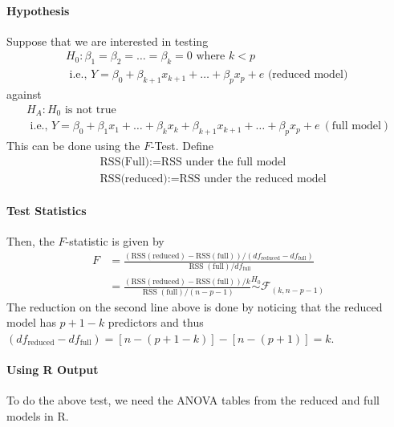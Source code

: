 \documentclass[10pt]{article}
\begin{document}
\paragraph{Hypothesis}  Suppose that we are interested in testing 
\begin{equation*}
    \begin{array}{c}{H_{0}: \beta_{1}=\beta_{2}=\ldots=\beta_{k}=0 \text { where } k<p} \\ {\text { i.e., } Y=\beta_{0}+\beta_{k+1} x_{k+1}+\ldots+\beta_{p} x_{p}+e \text { (reduced model) }}\end{array}
\end{equation*}
against
\begin{equation*}
    \begin{array}{c}{H_{A}: H_{0} \text { is not true }} \\ {\text { i.e., } Y=\beta_{0}+\beta_{1} x_{1}+\ldots+\beta_{k} x_{k}+\beta_{k+1} x_{k+1}+\ldots+\beta_{p} x_{p}+e ~(\text{full model})}\end{array}
\end{equation*}
This can be done using the $F$-Test. Define
\begin{align*}
    &\text{RSS(Full)} := \text{RSS under the full model} \\
    &\text{RSS(reduced)} := \text{RSS under the reduced model}
\end{align*}
\paragraph{Test Statistics}
Then, the $F$-statistic is given by
\begin{align*}
    F &= \frac{(\mathrm{RSS}(\mathrm{reduced})-\mathrm{RSS}(\mathrm{full})) /\left({df}_{\mathrm{reduced}}-{df}_{\mathrm{full}}\right)}{\operatorname{RSS}(\mathrm{full}) / {df}_{\mathrm{full}}} \\
    &= \frac{(\mathrm{RSS}(\mathrm{reduced})-\mathrm{RSS}(\mathrm{full})) / k}{\operatorname{RSS}(\mathrm{full}) /(n-p-1)} \overset{H_0}{\sim} \mathcal{F}_{(k, n-p-1)}
\end{align*}
The reduction on the second line above is done by noticing that the reduced model has $p + 1 - k$ predictors and thus $\left(df_{\mathrm{reduced}}-{df}_{\mathrm{full}}\right) = [n-(p+1-k)]-[n-(p+1)]=k$.
\paragraph{Using R Output} To do the above test, we need the ANOVA tables from the reduced and full models in R. 
\end{document}
